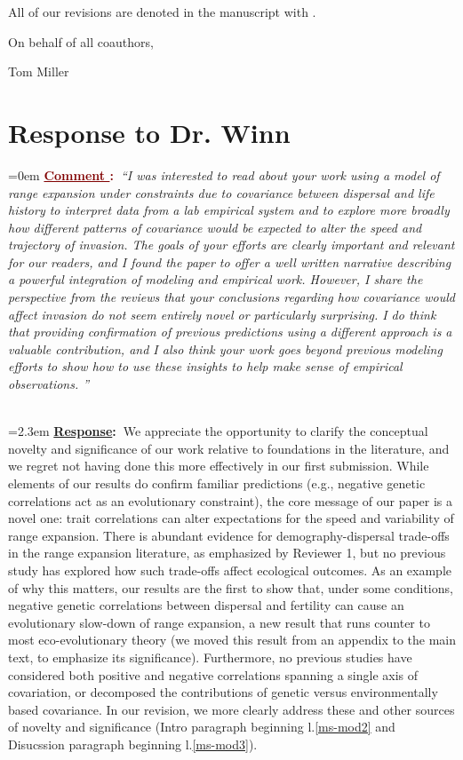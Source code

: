 \documentclass[12pt]{article}
\newcounter{cN}
\newcommand{\comment}[1]{
	\vspace{2em}
	\refstepcounter{cN} %
	\noindent \hangindent=0em \textbf{\textcolor{Maroon}{\uline{Comment \thecN}:~}}\emph{``#1''}
	}
\newcommand{\response}[1]{
	\\[0.25em]
	\hangindent=2.3em \textbf{\textcolor{NavyBlue}{\uline{Response}:~}}#1
	}
\newcommand{\revise}[1]{{\color{Mahogany}{#1}}}
\begin{document}
All of our revisions are denoted in the manuscript with \revise{Mahogany font}.

\vspace{2em}
\hfill On behalf of all coauthors,

\hfill Tom Miller
\newpage



\section{Response to Dr. Winn}
\vspace{-2em}

\comment{I was interested to read about your work using a model of range expansion under constraints due to covariance between dispersal and life history to interpret data from a lab empirical system and to explore more broadly how different patterns of covariance would be expected to alter the speed and trajectory of invasion.
The goals of your efforts are clearly important and relevant for our readers, and I found the paper to offer a well written narrative describing a powerful integration of modeling and empirical work.
However, I share the perspective from the reviews that your conclusions regarding how covariance would affect invasion do not seem entirely novel or particularly surprising.
I do think that providing confirmation of previous predictions using a different approach is a valuable contribution, and I also think your work goes beyond previous modeling efforts to show how to use these insights to help make sense of empirical observations. }
\response{We appreciate the opportunity to clarify the conceptual novelty and significance of our work relative to foundations in the literature, and we regret not having done this more effectively in our first submission.
While elements of our results do confirm familiar predictions (e.g., negative genetic correlations act as an evolutionary constraint), the core message of our paper is a novel one: trait correlations can alter expectations for the speed and variability of range expansion.
There is abundant evidence for demography-dispersal trade-offs in the range expansion literature, as emphasized by Reviewer 1, but no previous study has explored how such trade-offs affect ecological outcomes.
As an example of why this matters, our results are the first to show that, under some conditions, negative genetic correlations between dispersal and fertility can cause an evolutionary slow-down of range expansion, a new result that runs counter to most eco-evolutionary theory (we moved this result from an appendix to the main text, to emphasize its significance).
Furthermore, no previous studies have considered both positive and negative correlations spanning a single axis of covariation, or decomposed the contributions of genetic versus environmentally based covariance.
In our revision, we more clearly address these and other sources of novelty and significance (Intro paragraph beginning l.\ref{ms-mod2} and Disucssion paragraph beginning l.\ref{ms-mod3}).}
\end{document}
